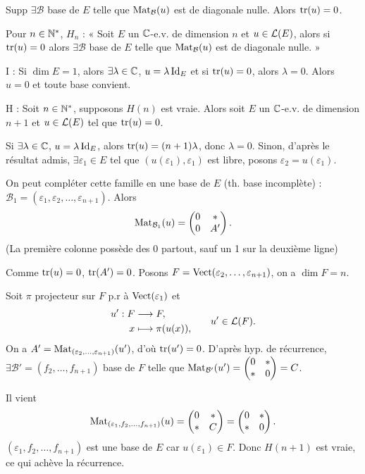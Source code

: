 \begin{solution}
Supp $\exists\mathcal B$ base de $E$ telle que $\operatorname{Mat}_{\mathcal B}(u)$ est de diagonale
nulle. Alors $\operatorname{tr}(u)=0$.

Pour $n\in\mathbb N^*$, $H_n$ : « Soit $E$ un $\mathbb C$-e.v. de dimension $n$ et $u\in\mathcal L(E)$,
alors si $\operatorname{tr}(u)=0$ alors $\exists\mathcal B$ base de $E$ telle que
$\operatorname{Mat}_{\mathcal B}(u)$ est de diagonale nulle. »

I : Si $\dim E=1$, alors $\exists\lambda\in\mathbb C$, $u=\lambda\operatorname{Id}_E$ et si $\operatorname{tr}(u)=0$,
alors $\lambda=0$. Alors $u=0$ et toute base convient.

H : Soit $n\in\mathbb N^*$, supposons $H(n)$ est vraie. Alors soit $E$ un $\mathbb C$-e.v. de dimension
$n+1$ et $u\in\mathcal L(E)$ tel que $\operatorname{tr}(u)=0$.

Si $\exists\lambda\in\mathbb C$, $u=\lambda\operatorname{Id}_E$, alors $\operatorname{tr}(u)=(n+1)\lambda$, donc
$\lambda=0$. Sinon, d'après le résultat admis, $\exists\varepsilon_1\in E$ tel que
$(u(\varepsilon_1),\varepsilon_1)$ est libre, posons $\varepsilon_2=u(\varepsilon_1)$.

On peut compléter cette famille en une base de $E$ (th. base incomplète) :
$\mathcal B_1=(\varepsilon_1,\varepsilon_2,\ldots,\varepsilon_{n+1})$. Alors
\[
\operatorname{Mat}_{\mathcal B_1}(u)=\begin{pmatrix}0&*\\0&A'\end{pmatrix}.
\]
(La première colonne possède des 0 partout, sauf un 1 sur la deuxième ligne)

Comme $\operatorname{tr}(u)=0$, $\operatorname{tr}(A')=0$. Posons
$F=\operatorname{Vect}(\varepsilon_2,\ldots,\varepsilon_{n+1})$, on a $\dim F=n$.

Soit $\pi$ projecteur sur $F$ p.r à $\operatorname{Vect}(\varepsilon_1)$ et
\[
\begin{aligned}u':F&\longrightarrow F,\\x&\longmapsto\pi(u(x)),\end{aligned}
\qquad u'\in\mathcal L(F).
\]
On a $A'=\operatorname{Mat}_{(\varepsilon_2,\ldots,\varepsilon_{n+1})}(u')$, d'où $\operatorname{tr}(u')=0$.
D'après hyp. de récurrence, $\exists\mathcal B'=(f_2,\ldots,f_{n+1})$ base de $F$ telle
que $\operatorname{Mat}_{\mathcal B'}(u')=\begin{pmatrix}0&*\\ *&0\end{pmatrix}=C$.

Il vient
\[
\operatorname{Mat}_{(\varepsilon_1,f_2,\ldots,f_{n+1})}(u)
=\begin{pmatrix}0&*\\ *&C\end{pmatrix}
=\begin{pmatrix}0&*\\ *&0\end{pmatrix}.
\]
$(\varepsilon_1,f_2,\ldots,f_{n+1})$ est une base de $E$ car $u(\varepsilon_1)\in F$.
Donc $H(n+1)$ est vraie, ce qui achève la récurrence.


\end{solution}
